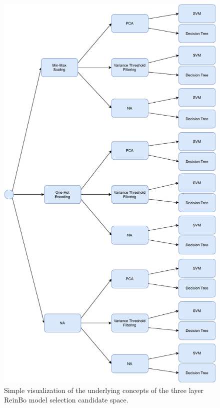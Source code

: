 \begin{figure}[ht!]
    \centering
    \includegraphics[width=\textwidth,height=0.7\textheight,keepaspectratio]{gfx/Figures/Theory/ReinBoModelSelection.pdf}
    \caption{Simple visualization of the underlying concepts of the three layer ReinBo model selection candidate space.}
    \label{fig:theory:reinbo-model-selection}
\end{figure}

